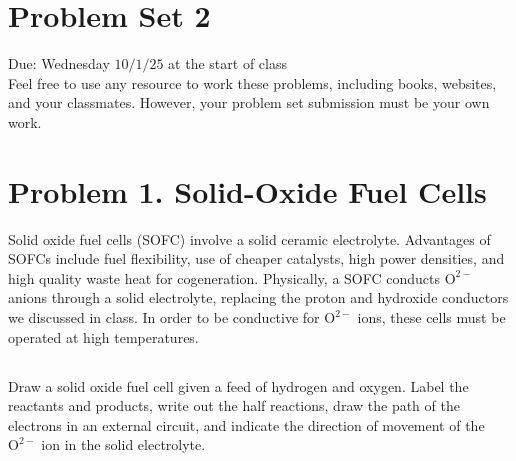 \documentclass[12pt]{article}
\begin{document}
\captionsetup{singlelinecheck=false}
\section*{Problem Set 2}
Due: Wednesday $10 / 1 / 25$ at the start of class\\
Feel free to use any resource to work these problems, including books, websites, and your classmates. However, your problem set submission must be your own work.

\section{Problem 1. Solid-Oxide Fuel Cells}
Solid oxide fuel cells (SOFC) involve a solid ceramic electrolyte. Advantages of SOFCs include fuel flexibility, use of cheaper catalysts, high power densities, and high quality waste heat for cogeneration. Physically, a SOFC conducts $\mathrm{O}^{2-}$ anions through a solid electrolyte, replacing the proton and hydroxide conductors we discussed in class. In order to be conductive for $\mathrm{O}^{2-}$ ions, these cells must be operated at high temperatures.\\
\subsection{}
 Draw a solid oxide fuel cell given a feed of hydrogen and oxygen. Label the reactants and products, write out the half reactions, draw the path of the electrons in an external circuit, and indicate the direction of movement of the $\mathrm{O}^{2-}$ ion in the solid electrolyte.\\
\end{document}
